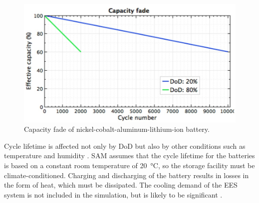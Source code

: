 \begin{figure}[bhtp]  
\centering
\includegraphics[width=0.75\linewidth]{FIG/CapacityFade}
\caption[Capacity fade of nickel-cobalt-aluminum-lithium-ion battery.]{Capacity fade of nickel-cobalt-aluminum-lithium-ion battery.}\label{CapacityFade}
\end{figure}


Cycle lifetime is affected not only by \ac{DoD} but also by other conditions such as temperature and humidity \cite{MitElectricVehilceTeam2008}. \ac{SAM} assumes that the cycle lifetime for the batteries is based on a constant room temperature of \SI{20}{\celsius}, so the storage facility must be climate-conditioned. Charging and discharging of the battery results in losses in the form of heat, which must be dissipated. The cooling demand of the \ac{EES} system is not included in the simulation, but is likely to be significant \cite{Diorio2015}.


